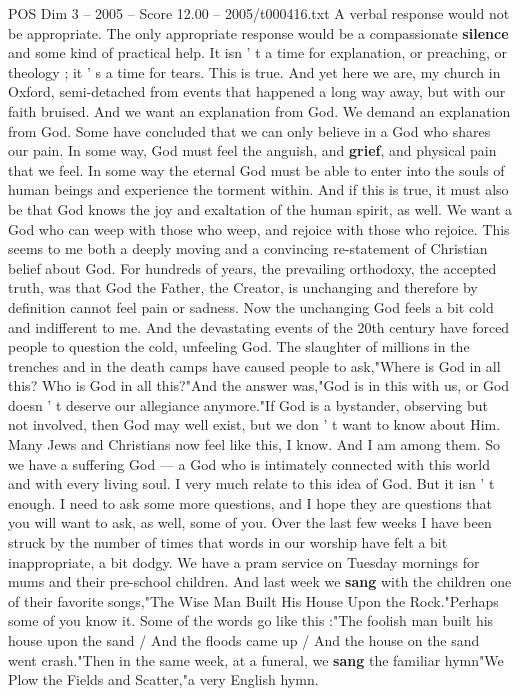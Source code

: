\begin{textsample}{POS Dim 3 – 2005 – Score 12.00 – 2005/t000416.txt}
A verbal response would not be appropriate.
The only appropriate response would be a compassionate \textbf{silence} and some kind of practical help.
It isn ' t a time for explanation, or preaching, or theology ; it ' s a time for tears.
This is true.
And yet here we are, my church in Oxford, semi-detached from events that happened a long way away, but with our faith bruised.
And we want an explanation from God.
We demand an explanation from God.
Some have concluded that we can only believe in a God who shares our pain.
In some way, God must feel the anguish, and \textbf{grief}, and physical pain that we feel.
In some way the eternal God must be able to enter into the souls of human beings and experience the torment within.
And if this is true, it must also be that God knows the joy and exaltation of the human spirit, as well.
We want a God who can weep with those who weep, and rejoice with those who rejoice.
This seems to me both a deeply moving and a convincing re-statement of Christian belief about God.
For hundreds of years, the prevailing orthodoxy, the accepted truth, was that God the Father, the Creator, is unchanging and therefore by definition cannot feel pain or sadness.
Now the unchanging God feels a bit cold and indifferent to me.
And the devastating events of the 20th century have forced people to question the cold, unfeeling God.
The slaughter of millions in the trenches and in the death camps have caused people to ask,"Where is God in all this?
Who is God in all this?"And the answer was,"God is in this with us, or God doesn ' t deserve our allegiance anymore."If God is a bystander, observing but not involved, then God may well exist, but we don ' t want to know about Him.
Many Jews and Christians now feel like this, I know.
And I am among them.
So we have a suffering God — a God who is intimately connected with this world and with every living soul.
I very much relate to this idea of God.
But it isn ' t enough.
I need to ask some more questions, and I hope they are questions that you will want to ask, as well, some of you.
Over the last few weeks I have been struck by the number of times that words in our worship have felt a bit inappropriate, a bit dodgy.
We have a pram service on Tuesday mornings for mums and their pre-school children.
And last week we \textbf{sang} with the children one of their favorite songs,"The Wise Man Built His House Upon the Rock."Perhaps some of you know it.
Some of the words go like this :"The foolish man built his house upon the sand / And the floods came up / And the house on the sand went crash."Then in the same week, at a funeral, we \textbf{sang} the familiar hymn"We Plow the Fields and Scatter,"a very English hymn.

\end{textsample}
